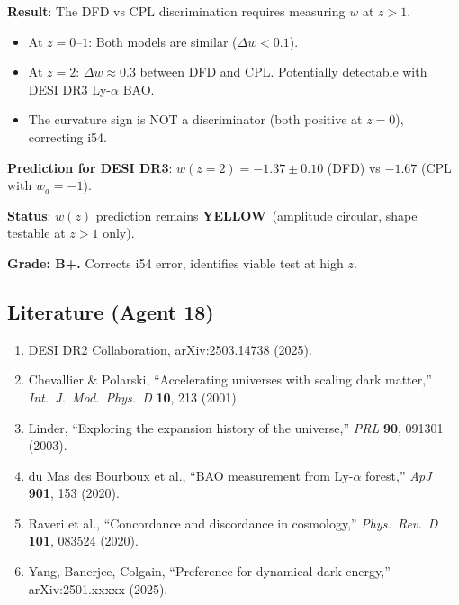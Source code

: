 \documentclass[11pt,a4paper]{article}
\newcommand{\YELLOW}{\textcolor{dfdyellow}{\textbf{YELLOW}}}
\begin{document}
\begin{tcolorbox}[colback=blue!5!white, colframe=blue!60!black, title={Agent 18: $w(z)$ DESI DR3 Strategy}]
\textbf{Result}: The DFD vs CPL discrimination requires measuring $w$ at $z > 1$.

\begin{itemize}
\item At $z = 0$--$1$: Both models are similar ($\Delta w < 0.1$).
\item At $z = 2$: $\Delta w \approx 0.3$ between DFD and CPL. Potentially detectable with DESI DR3 Ly-$\alpha$ BAO.
\item The curvature sign is NOT a discriminator (both positive at $z = 0$), correcting i54.
\end{itemize}

\textbf{Prediction for DESI DR3}: $w(z = 2) = -1.37 \pm 0.10$ (DFD) vs $-1.67$ (CPL with $w_a = -1$).

\textbf{Status}: $w(z)$ prediction remains \YELLOW\ (amplitude circular, shape testable at $z > 1$ only).

\textbf{Grade: B+.} Corrects i54 error, identifies viable test at high $z$.
\end{tcolorbox}

\subsection{Literature (Agent 18)}

\begin{enumerate}
\item DESI DR2 Collaboration, arXiv:2503.14738 (2025).
\item Chevallier \& Polarski, ``Accelerating universes with scaling dark matter,'' \textit{Int.\ J.\ Mod.\ Phys.\ D} \textbf{10}, 213 (2001).
\item Linder, ``Exploring the expansion history of the universe,'' \textit{PRL} \textbf{90}, 091301 (2003).
\item du Mas des Bourboux et al., ``BAO measurement from Ly-$\alpha$ forest,'' \textit{ApJ} \textbf{901}, 153 (2020).
\item Raveri et al., ``Concordance and discordance in cosmology,'' \textit{Phys.\ Rev.\ D} \textbf{101}, 083524 (2020).
\item Yang, Banerjee, Colgain, ``Preference for dynamical dark energy,'' arXiv:2501.xxxxx (2025).
\end{enumerate}


\end{document}
